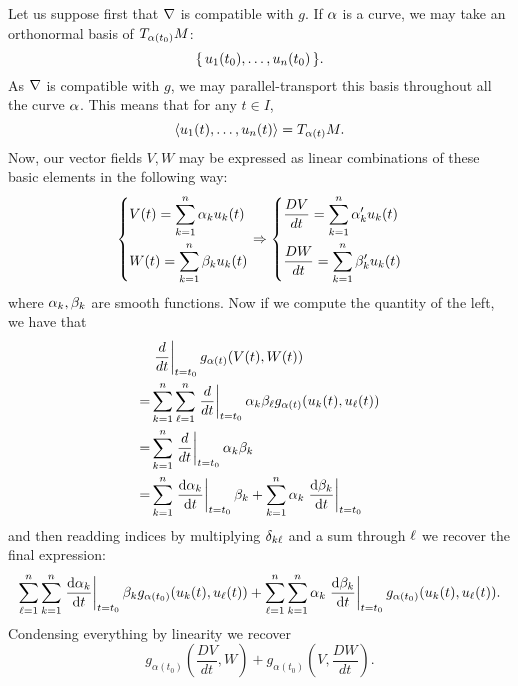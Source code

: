 \documentclass[12pt]{memoir}
\begin{document}
\begin{ptcbr}
Let us suppose first that $\nabla$ is compatible with $g$. If $\alpha$ is a curve, we may take an orthonormal basis of $T_{\alpha(t_0)}M$:
$$\{\,u_1(t_0),\dots,u_n(t_0)\,\}.$$
As $\nabla$ is compatible with $g$, we may parallel-transport this basis throughout all the curve $\alpha$. This means that for any $t\in I$, 
$$\left\langle u_1(t),\dots,u_n(t)\right\rangle=T_{\alpha(t)}M.$$
Now, our vector fields $V,W$ may be expressed as linear combinations of these basic elements in the following way:
$$
\left\lbrace
\begin{aligned}
	&V(t)=\sum_{k=1}^n\alpha_ku_k(t)\\
	&W(t)=\sum_{k=1}^n\beta_ku_k(t)
\end{aligned}
\right.\Rightarrow
\left\lbrace
\begin{aligned}
	&\frac{DV}{dt}=\sum_{k=1}^n\alpha_k'u_k(t)\\
	&\frac{DW}{dt}=\sum_{k=1}^n\beta_k'u_k(t)
\end{aligned}
\right.
$$
where $\alpha_k,\beta_k$ are smooth functions. Now if we compute the quantity of the left, we have that 
\begin{align*}
	&\left.\frac{d}{dt}\right|_{t=t_0} g_{\alpha(t)}(V(t),W(t))\\
	=&\sum_{k=1}^{n}\sum_{\ell=1}^{n}\left.\frac{d}{dt}\right|_{t=t_0}\alpha_k\beta_\ell g_{\alpha(t)}(u_k(t),u_\ell(t))\\
	=&\sum_{k=1}^{n}\left.\frac{d}{dt}\right|_{t=t_0}\alpha_k\beta_k\\
	=&\sum_{k=1}^{n}\left.\dv{\alpha_k}{t}\right|_{t=t_0}\beta_k+\sum_{k=1}^{n}\alpha_k\left.\dv{\beta_k}{t}\right|_{t=t_0}\\
\end{align*}
and then readding indices by multiplying $\delta_{k\ell}$ and a sum through $\ell$ we recover the final expression:
$$\sum_{\ell=1}^n\sum_{k=1}^{n}\left.\dv{\alpha_k}{t}\right|_{t=t_0}\beta_kg_{\alpha(t_0)}(u_k(t),u_\ell(t))+\sum_{\ell=1}^n\sum_{k=1}^{n}\alpha_k\left.\dv{\beta_k}{t}\right|_{t=t_0}g_{\alpha(t_0)}(u_k(t),u_\ell(t)).$$
Condensing everything by linearity we recover
$$g_{\alpha(t_0)} \left(\frac{DV}{dt},W\right) + g_{\alpha(t_0)} \left(V,\frac{DW}{dt}\right).$$
\end{ptcbr}
\end{document}
